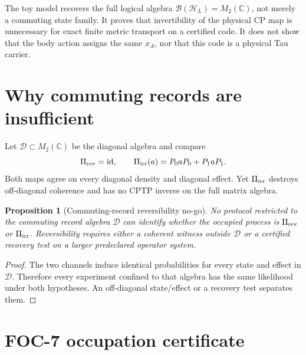 \documentclass[11pt]{article}
\newtheorem{proposition}{Proposition}
\newcommand{\id}{\operatorname{id}}
\begin{document}
The toy model recovers the full logical algebra
\(\mathcal B(\mathcal H_L)=M_2(\mathbb C)\), not merely a commuting state
family.  It proves that invertibility of the physical CP map is unnecessary
for exact finite metric transport on a certified code.  It does not show that
the body action assigns the same \(x_A\), nor that this code is a physical Tau
carrier.

\section{Why commuting records are insufficient}

Let \(\mathcal D\subset M_2(\mathbb C)\) be the diagonal algebra and compare
\begin{equation}
 \Pi_{\rm rev}=\id,
 \qquad
 \Pi_{\rm irr}(a)=P_0aP_0+P_1aP_1.
 \label{eq:dephasing-control}
\end{equation}
Both maps agree on every diagonal density and diagonal effect.  Yet
\(\Pi_{\rm irr}\) destroys off-diagonal coherence and has no CPTP inverse on
the full matrix algebra.

\begin{proposition}[Commuting-record reversibility no-go]
No protocol restricted to the commuting record algebra \(\mathcal D\) can
identify whether the occupied process is \(\Pi_{\rm rev}\) or
\(\Pi_{\rm irr}\).  Reversibility requires either a coherent witness outside
\(\mathcal D\) or a certified recovery test on a larger predeclared operator
system.
\end{proposition}
\begin{proof}
The two channels induce identical probabilities for every state and effect in
\(\mathcal D\).  Therefore every experiment confined to that algebra has the
same likelihood under both hypotheses.  An off-diagonal state/effect or a
recovery test separates them.
\end{proof}

\section{FOC-7 occupation certificate}
\end{document}
